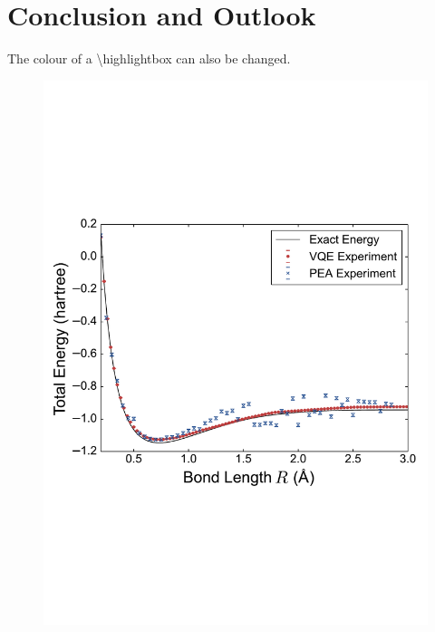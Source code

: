 \documentclass[14pt,landscape,color=UCLdarkred,margin=3cm]{uclposter}
\begin{document}
\begin{multicols}{3}
\begin{figure}[H]
   
\end{figure}



\columnbreak

\section*{Conclusion and Outlook}

\begin{highlightbox}
	The colour of a \textbackslash highlightbox can also be changed.
\end{highlightbox}

\begin{figure}[H]
  \begin{center}
  \includegraphics[scale=1.5]{result.pdf}
  \end{center}
    
 

   
\end{figure}




\end{multicols}
	
\end{document}
